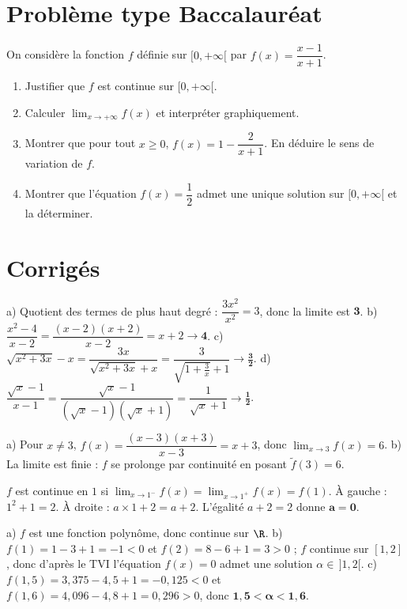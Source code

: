 \section{Problème type Baccalauréat}

On considère la fonction $f$ définie sur $[0,+\infty[$ par $f(x)=\dfrac{x-1}{x+1}$.
\begin{enumerate}[label=\arabic*)]
\item Justifier que $f$ est continue sur $[0,+\infty[$.
\item Calculer $\displaystyle\lim_{x\to+\infty}f(x)$ et interpréter graphiquement.
\item Montrer que pour tout $x\ge0$, $f(x)=1-\dfrac{2}{x+1}$. En déduire le sens de variation de $f$.
\item Montrer que l'équation $f(x)=\dfrac12$ admet une unique solution sur $[0,+\infty[$ et la déterminer.
\end{enumerate}

\section{Corrigés}

a) Quotient des termes de plus haut degré : $\dfrac{3x^{2}}{x^{2}}=3$, donc la limite est $\mathbf{3}$.\;
b) $\dfrac{x^{2}-4}{x-2}=\dfrac{(x-2)(x+2)}{x-2}=x+2\to\mathbf{4}$.\;
c) $\sqrt{x^{2}+3x}-x=\dfrac{3x}{\sqrt{x^{2}+3x}+x}=\dfrac{3}{\sqrt{1+\frac3x}+1}\to\mathbf{\frac32}$.\;
d) $\dfrac{\sqrt x-1}{x-1}=\dfrac{\sqrt x-1}{(\sqrt x-1)(\sqrt x+1)}=\dfrac{1}{\sqrt x+1}\to\mathbf{\frac12}$.

a) Pour $x\neq3$, $f(x)=\dfrac{(x-3)(x+3)}{x-3}=x+3$, donc $\displaystyle\lim_{x\to3}f(x)=6$.\;
b) La limite est finie : $f$ se prolonge par continuité en posant $\tilde f(3)=6$.

$f$ est continue en $1$ si $\displaystyle\lim_{x\to1^{-}}f(x)=\lim_{x\to1^{+}}f(x)=f(1)$.
À gauche : $1^{2}+1=2$. À droite : $a\times1+2=a+2$. L'égalité $a+2=2$ donne $\mathbf{a=0}$.

a) $f$ est une fonction polynôme, donc continue sur $\R$.\;
b) $f(1)=1-3+1=-1<0$ et $f(2)=8-6+1=3>0$ ; $f$ continue sur $[1,2]$, donc d'après le TVI l'équation $f(x)=0$ admet une solution $\alpha\in\,]1,2[$.\;
c) $f(1{,}5)=3{,}375-4{,}5+1=-0{,}125<0$ et $f(1{,}6)=4{,}096-4{,}8+1=0{,}296>0$, donc $\mathbf{1{,}5<\alpha<1{,}6}$.

